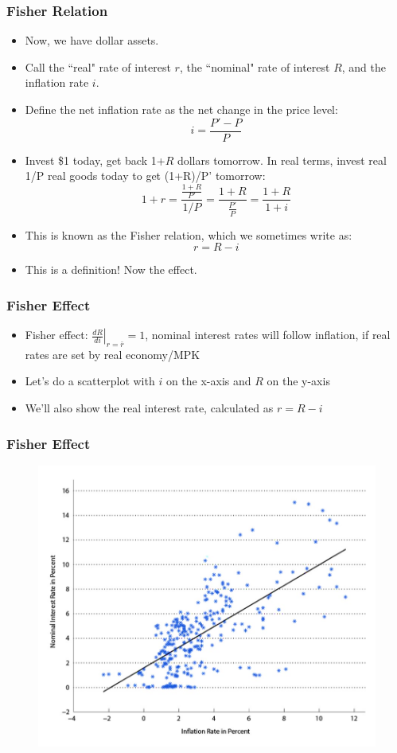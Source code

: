 \documentclass{beamer}
\begin{document}
\begin{frame}
\frametitle[alignment=center]{Fisher Relation}
\begin{itemize}
\item Now, we have dollar assets.
\smallskip
\item Call the ``real" rate of interest $r$, the ``nominal" rate of interest $R$, and the inflation rate $i$.  
\smallskip
\item Define the net inflation rate as the net change in the price level:
$$i=\frac{P'-P}{P}$$
\smallskip
\item Invest \$1 today, get back 1+$R$ dollars tomorrow.  In real terms, invest real 1/P real goods today to get (1+R)/P' tomorrow:
$$1+r=\frac{\frac{1+R}{P'}}{1/P}=\frac{1+R}{\frac{P'}{P}}=\frac{1+R}{1+i}$$
\item This is known as the Fisher relation, which we sometimes write as:
$$r=R-i$$
\item This is a definition!  Now the effect.
\end{itemize}
\end{frame}

\begin{frame}
\frametitle[alignment=center]{Fisher Effect}
\begin{itemize}
\item Fisher effect:  $\left.\frac{d R}{d i}\right|_{r=\bar{r}}=1$, nominal interest rates will follow inflation, if real rates are set by real economy/MPK 
\bigskip
\item Let's do a scatterplot with $i$ on the x-axis and $R$ on the y-axis
\bigskip
\item We'll also show the real interest rate, calculated as $r=R-i$
\end{itemize}
\end{frame}

\begin{frame}
\frametitle[alignment=center]{Fisher Effect}
\begin{figure}
\centering
\includegraphics[scale=0.65]{Figures/W_Fig_12pt1.png}
\end{figure}
\end{frame}
\end{document}
